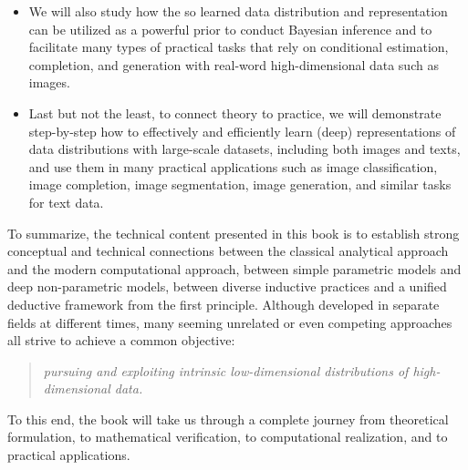 \documentclass[../../book-main.tex]{subfiles}
\begin{document}
\begin{itemize}
\item We will also study how the so learned data distribution and representation can be utilized as a powerful prior to conduct Bayesian inference and to facilitate many types of practical tasks that rely on conditional estimation, completion, and generation with real-word high-dimensional data such as images. 

\item Last but not the least, to connect theory to practice, we will demonstrate step-by-step how to effectively and efficiently learn (deep) representations of data distributions with large-scale datasets, including both images and texts, and use them in many practical applications such as image classification, image completion, image segmentation, image generation, and similar tasks for text data. 
\end{itemize}

To summarize, the technical content presented in this book is to establish strong conceptual and technical connections between the classical analytical approach and the modern computational approach, between simple parametric models and deep non-parametric models, between diverse inductive practices and a unified deductive framework from the first principle. Although developed in separate fields at different times, many seeming unrelated or even competing approaches all strive to achieve a common objective: 
\begin{quote}
{\em pursuing and exploiting intrinsic low-dimensional distributions of high-dimensional data.}    
\end{quote}
To this end, the book will take us through a complete journey from theoretical formulation, to mathematical verification, to computational realization, and to practical applications.
\end{document}
